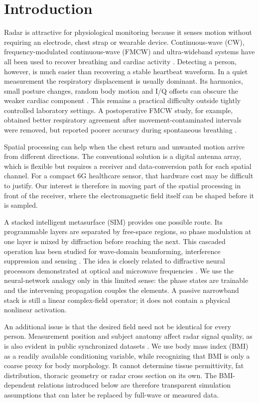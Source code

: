 \documentclass[pdflatex,sn-nature]{sn-jnl}
\begin{document}
\section{Introduction}
Radar is attractive for physiological monitoring because it senses motion without
requiring an electrode, chest strap or wearable device. Continuous-wave (CW),
frequency-modulated continuous-wave (FMCW) and ultra-wideband systems have all been
used to recover breathing and cardiac activity \cite{li2013review,hu2014quadrature,
michler2019clinical}. Detecting a person, however, is much easier than recovering a
stable heartbeat waveform. In a quiet measurement the respiratory displacement is
usually dominant. Its harmonics, small posture changes, random body motion and I/Q
offsets can obscure the weaker cardiac component \cite{li2008movement,li2013review}.
This remains a practical difficulty outside tightly controlled laboratory settings.
A postoperative FMCW study, for example, obtained better respiratory agreement after
movement-contaminated intervals were removed, but reported poorer accuracy during
spontaneous breathing \cite{vanloon2016clinical}.

Spatial processing can help when the chest return and unwanted motion arrive from
different directions. The conventional solution is a digital antenna array, which is
flexible but requires a receiver and data-conversion path for each spatial channel.
For a compact 6G healthcare sensor, that hardware cost may be difficult to justify.
Our interest is therefore in moving part of the spatial processing in front of the
receiver, where the electromagnetic field itself can be shaped before it is sampled.

A stacked intelligent metasurface (SIM) provides one possible route. Its programmable
layers are separated by free-space regions, so phase modulation at one layer is mixed
by diffraction before reaching the next. This cascaded operation has been studied for
wave-domain beamforming, interference suppression and sensing
\cite{an2023beamforming,an2024transceiver,an2024dft,niu2024isac}. The idea is closely
related to diffractive neural processors demonstrated at optical and microwave
frequencies \cite{lin2018d2nn,liu2022programmable}. We use the neural-network analogy
only in this limited sense: the phase states are trainable and the intervening
propagation couples the elements. A passive narrowband stack is still a linear
complex-field operator; it does not contain a physical nonlinear activation.

An additional issue is that the desired field need not be identical for every
person. Measurement position and subject anatomy affect radar signal quality, as is
also evident in public synchronized datasets \cite{shi2020dataset,edanami2022dataset}.
We use body mass index (BMI) as a readily available conditioning variable, while
recognizing that BMI is only a coarse proxy for body morphology. It cannot determine
tissue permittivity, fat distribution, thoracic geometry or radar cross section on
its own. The BMI-dependent relations introduced below are therefore transparent
simulation assumptions that can later be replaced by full-wave or measured data.
\end{document}
